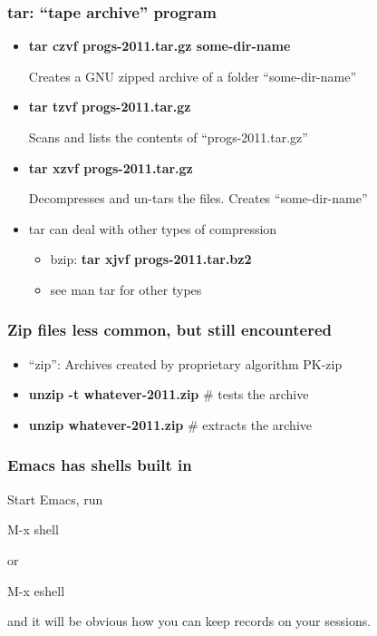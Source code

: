 \documentclass[English]{beamer}
\begin{document}
\begin{frame}
  \frametitle{tar: ``tape archive'' program}
  \begin{itemize}
    \item \textbf{tar czvf progs-2011.tar.gz some-dir-name}

      Creates a GNU zipped archive of a folder ``some-dir-name''

    \item \textbf{tar tzvf progs-2011.tar.gz}

      Scans and lists the contents of ``progs-2011.tar.gz''
      

   \item \textbf{tar xzvf progs-2011.tar.gz}

     Decompresses and un-tars the files. Creates ``some-dir-name''

     
   \item tar can deal with other types of compression
     \begin{itemize}
       
     \item bzip: \textbf{tar xjvf  progs-2011.tar.bz2}
     \item see man tar for other types
     \end{itemize}
  
  
   \end{itemize}
 \end{frame}

 \begin{frame}
   \frametitle{Zip files less common, but still encountered}
   \begin{itemize}
   \item ``zip'': Archives created by proprietary algorithm PK-zip
   \item \textbf{unzip -t whatever-2011.zip} \# tests the archive

   \item \textbf{unzip whatever-2011.zip} \# extracts the archive
   \end{itemize}
 \end{frame}

\begin{frame}
 \frametitle{Emacs has shells built in}
 Start Emacs, run

 M-x shell

or

 M-x eshell

and it will be obvious how you can keep records on your sessions.

\end{frame}
\end{document}
